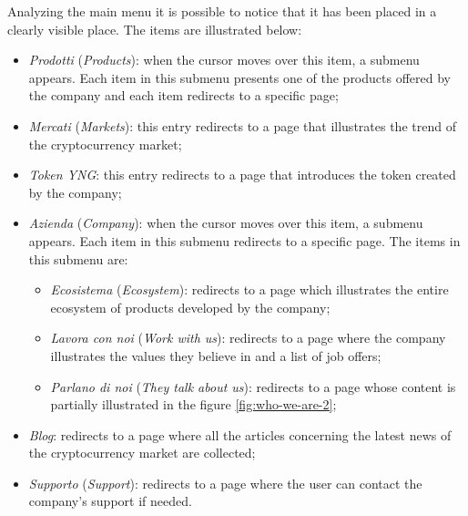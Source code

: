 Analyzing the main menu it is possible to notice that it has been placed 
in a clearly visible place. The items are illustrated below:
\begin{itemize}
  \item \textit{Prodotti} (\textit{Products}): when the cursor moves over 
  this item, a submenu appears. Each item in this submenu presents one of 
  the products offered by the company and each item redirects to a specific 
  page;

  \item \textit{Mercati} (\textit{Markets}): this entry redirects to a page 
  that illustrates the trend of the cryptocurrency market;
  
  \item \textit{Token YNG}: this entry redirects to a page that introduces 
  the token created by the company;

  \item \textit{Azienda} (\textit{Company}): when the cursor moves over 
  this item, a submenu appears. Each item in this submenu redirects to a 
  specific page. The items in this submenu are:
  \begin{itemize}
    \item \textit{Ecosistema} (\textit{Ecosystem}): redirects to a page 
    which illustrates the entire ecosystem of products developed by the 
    company;

    \item \textit{Lavora con noi} (\textit{Work with us}): redirects to a 
    page where the company illustrates the values they believe in and a 
    list of job offers;

    \item \textit{Parlano di noi} (\textit{They talk about us}): redirects 
    to a page whose content is partially illustrated in the figure 
    \ref{fig:who-we-are-2};
  \end{itemize}

  \item \textit{Blog}: redirects to a page where all the articles 
  concerning the latest news of the cryptocurrency market are collected;

  \item \textit{Supporto} (\textit{Support}): redirects to a page where 
  the user can contact the company's support if needed.
\end{itemize}

